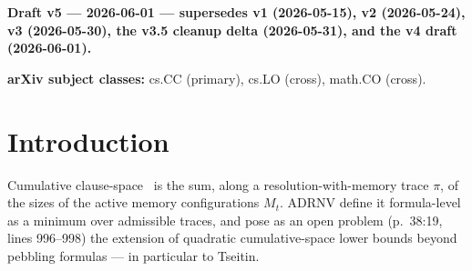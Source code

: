 \documentclass[11pt,a4paper]{article}
\theoremstyle{remark}
\begin{document}
\begin{abstract}
excluding the $n=60$ cell collapses the shift to $+0.07$ $[+0.03, +0.11]$.
No-inprocessing is reported as suggestive ($+0.14$ $[+0.07, +0.18]$ full
range; CI crosses zero without $n=60$). No-eliminate is null. Roughly 10\%
of the DRAT/DP exponent gap is attributable to restart strategy, with the
caveat that the signal is concentrated at $n=60$.
(v) On $Q_5$ Tseitin, DP-min-occurrence deterministically aborts at step
37 with final database $2^{20}$ at $\mathrm{MAX\_DB} = 4 \times 10^6$
across all three seeds; the $Q_5$ slope is therefore
\textbf{not measurable} under this heuristic, and the v3 ``treewidth not
degree'' framing is reframed as a structural negative.
(vi) On random-4-regular Tseitin (DP-infeasible: 5/5 \texttt{BLEW\_UP} at
$n=16$), kissat-DRAT~\cite{kissat,WHH2014} gives slope 7.69 on $n \in \{16, 20, 24, 28\}$; this
closes the v3 symmetric-comparison defect at the cost of a proof-system
confound (DP on $Q_4$ vs DRAT on rand\_4reg), which we acknowledge rather
than wave away. The headline reading of this paper is: \textbf{a
cumulative-entropy proxy $\Phi$ for resolution refutations on Tseitin
formulas, with a measured exponent $\widehat\alpha_{\Phi} \approx 4.43$
reported as a heuristic-specific quantity with no formal ordering to
cumulative space, after surgical retractions of the v4 Lemma A direction
and the $\Omega(n^2)$ Corollary C2 chain.} The exercise is offered as a
methodological template for cumulative-space empirics, not as evidence
bearing on P vs NP. The ADRNV open problem on Tseitin (p.~38:19, lines
996--998) is reaffirmed as open and is \textbf{not} addressed.
\end{abstract}

\medskip

\noindent\textbf{Draft v5 --- 2026-06-01 --- supersedes v1 (2026-05-15),
v2 (2026-05-24), v3 (2026-05-30), the v3.5 cleanup delta (2026-05-31), and
the v4 draft (2026-06-01).}

\noindent\textbf{arXiv subject classes:} cs.CC (primary), cs.LO (cross),
math.CO (cross).

\tableofcontents

\section{Introduction}

Cumulative clause-space~\cite{ADRNV2017} is the sum, along a
resolution-with-memory trace $\pi$, of the sizes of the active memory
configurations $M_t$. ADRNV define it formula-level as a minimum over
admissible traces, and pose as an open problem (p.~38:19, lines 996--998)
the extension of quadratic cumulative-space lower bounds beyond pebbling
formulas --- in particular to Tseitin.
\end{document}
